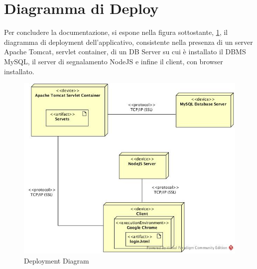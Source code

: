 \section{Diagramma di Deploy}

Per concludere la documentazione, si espone nella figura sottostante, \ref{gfx:deploy}, il diagramma di deployment dell'applicativo, consistente nella presenza di un server Apache Tomcat, servlet container, di un DB Server su cui è installato il DBMS MySQL, il server di segnalamento NodeJS e infine il client, con browser installato.

\begin{figure}[!htbp]
	\centering
	\includegraphics[scale = .4]{img/DeploymentDiagram.jpg}
	\caption{Deployment Diagram}
	\label{gfx:deploy}
\end{figure}